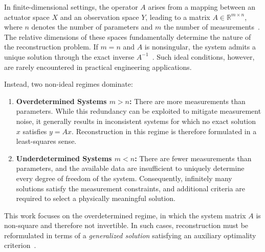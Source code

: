 In finite-dimensional settings, the operator $A$ arises from a mapping between an actuator space $X$ and an observation space $Y$, leading to a matrix $A \in \mathbb{R}^{m \times n}$, where $n$ denotes the number of parameters and $m$ the number of measurements~\cite{mueller-2012}. The relative dimensions of these spaces fundamentally determine the nature of the reconstruction problem. If $m = n$ and $A$ is nonsingular, the system admits a unique solution through the exact inverse $A^{-1}$~\cite{abdumuminova-2025}. Such ideal conditions, however, are rarely encountered in practical engineering applications.

Instead, two non-ideal regimes dominate:
\begin{enumerate}
    \item \textbf{Overdetermined Systems $m > n$:} There are more measurements than parameters. While this redundancy can be exploited to mitigate measurement noise, it generally results in inconsistent systems for which no exact solution $x$ satisfies $y = Ax$. Reconstruction in this regime is therefore formulated in a least-squares sense.

    \item \textbf{Underdetermined Systems $m < n$:} There are fewer measurements than  parameters, and the available data are insufficient to uniquely determine every degree of freedom of the system. Consequently, infinitely many solutions satisfy the measurement constraints, and additional criteria are required to select a physically meaningful solution.
\end{enumerate}

This work focuses on the overdetermined regime, in which the system matrix $A$ is non-square and therefore not invertible. In such cases, reconstruction must be reformulated in terms of a \textit{generalized solution} satisfying an auxiliary optimality criterion~\cite{mueller-2012}.

